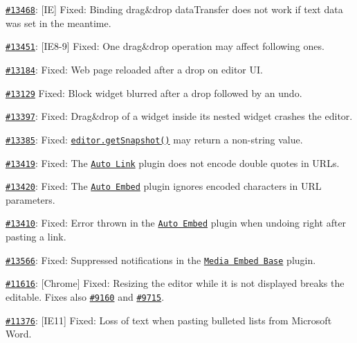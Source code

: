 \begin{DoxyItemize}
\item \href{http://dev.ckeditor.com/ticket/13468}{\tt \#13468}\+: \mbox{[}IE\mbox{]} Fixed\+: Binding drag\&drop {\ttfamily data\+Transfer} does not work if {\ttfamily text} data was set in the meantime.
\item \href{http://dev.ckeditor.com/ticket/13451}{\tt \#13451}\+: \mbox{[}I\+E8-\/9\mbox{]} Fixed\+: One drag\&drop operation may affect following ones.
\item \href{http://dev.ckeditor.com/ticket/13184}{\tt \#13184}\+: Fixed\+: Web page reloaded after a drop on editor UI.
\item \href{http://dev.ckeditor.com/ticket/13129}{\tt \#13129} Fixed\+: Block widget blurred after a drop followed by an undo.
\item \href{http://dev.ckeditor.com/ticket/13397}{\tt \#13397}\+: Fixed\+: Drag\&drop of a widget inside its nested widget crashes the editor.
\item \href{http://dev.ckeditor.com/ticket/13385}{\tt \#13385}\+: Fixed\+: \href{http://docs.ckeditor.com/#!/api/CKEDITOR.editor-method-getSnapshot}{\tt {\ttfamily editor.\+get\+Snapshot()}} may return a non-\/string value.
\item \href{http://dev.ckeditor.com/ticket/13419}{\tt \#13419}\+: Fixed\+: The \href{http://ckeditor.com/addon/autolink}{\tt Auto Link} plugin does not encode double quotes in U\+R\+Ls.
\item \href{http://dev.ckeditor.com/ticket/13420}{\tt \#13420}\+: Fixed\+: The \href{http://ckeditor.com/addon/autoembed}{\tt Auto Embed} plugin ignores encoded characters in U\+RL parameters.
\item \href{http://dev.ckeditor.com/ticket/13410}{\tt \#13410}\+: Fixed\+: Error thrown in the \href{http://ckeditor.com/addon/autoembed}{\tt Auto Embed} plugin when undoing right after pasting a link.
\item \href{http://dev.ckeditor.com/ticket/13566}{\tt \#13566}\+: Fixed\+: Suppressed notifications in the \href{http://ckeditor.com/addon/embedbase}{\tt Media Embed Base} plugin.
\item \href{http://dev.ckeditor.com/ticket/11616}{\tt \#11616}\+: \mbox{[}Chrome\mbox{]} Fixed\+: Resizing the editor while it is not displayed breaks the editable. Fixes also \href{http://dev.ckeditor.com/ticket/9160}{\tt \#9160} and \href{http://dev.ckeditor.com/ticket/9715}{\tt \#9715}.
\item \href{http://dev.ckeditor.com/ticket/11376}{\tt \#11376}\+: \mbox{[}I\+E11\mbox{]} Fixed\+: Loss of text when pasting bulleted lists from Microsoft Word.

\end{DoxyItemize}
